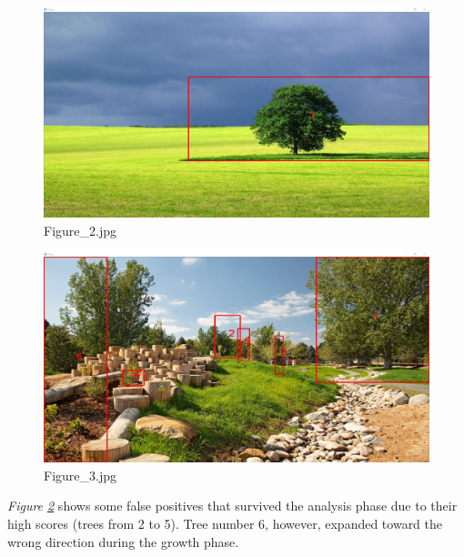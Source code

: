 \documentclass{article}
\begin{document}
\begin{figure}[h]
\begin{center}
\includegraphics[width=1\textwidth]{images/b2}
\caption{\footnotesize{Figure\_2.jpg}}
\label{img:benchmark2}
\end{center}
\end{figure}

\begin{figure}[h]
\begin{center}
\includegraphics[width=1\textwidth]{images/b3}
\caption{\footnotesize{Figure\_3.jpg}}
\label{img:benchmark3}
\end{center}
\end{figure}

\textit{Figure \ref{img:benchmark3}} shows some false positives that survived the analysis phase due to their high scores (trees from 2 to 5). Tree number 6, however, expanded toward the wrong direction during the growth phase.
\end{document}
